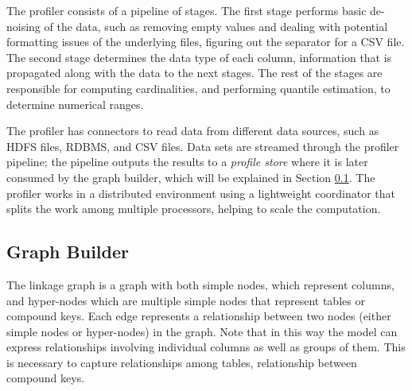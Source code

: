 The profiler consists of a pipeline of stages. The first stage
performs basic de-noising of the data, such as removing empty values and dealing
with potential formatting issues of the underlying files, \eg figuring out the
separator for a CSV file.  The second stage determines the data type of each
column, information that is propagated along with the data to the next stages.
The rest of the stages are responsible for computing cardinalities, and performing
quantile estimation, \eg to determine numerical ranges.

The profiler has connectors to read data from different data sources, such as
HDFS files, RDBMS, and CSV files. Data sets are streamed through the profiler
pipeline;  the pipeline outputs the results
to a {\it profile store} where it is later consumed by the graph builder, which
will be explained in Section \ref{subsec:graphbuild}.
The profiler works in a distributed environment using a lightweight coordinator
that splits the work among multiple processors, helping to scale the
computation.



\subsection{Graph Builder}
\label{subsec:graphbuild}

The linkage graph is a graph with both simple nodes, which represent columns,
and hyper-nodes which are multiple simple nodes that represent tables or
compound keys. Each edge represents a relationship between two nodes (either simple nodes or
hyper-nodes) in the graph. Note that in this way the model can express
relationships involving individual columns as well as groups of them. This is
necessary to capture relationships among tables, \eg \pkfk relationship between
compound keys.


